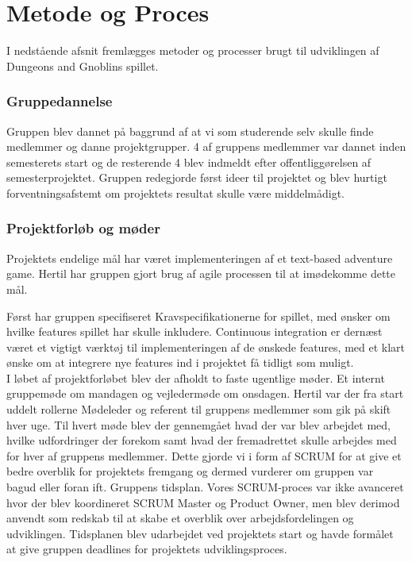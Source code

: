 \newpage

\section{Metode og Proces}
I nedstående afsnit fremlægges metoder og processer brugt til udviklingen af
Dungeons and Gnoblins spillet.

\subsubsection{Gruppedannelse}
Gruppen blev dannet på baggrund af at vi som studerende selv skulle finde medlemmer og danne projektgrupper. 4 af gruppens medlemmer var dannet inden semesterets start og de resterende 4 blev indmeldt efter offentliggørelsen af semesterprojektet. Gruppen redegjorde først ideer til projektet og blev hurtigt forventningsafstemt om projektets resultat skulle være middelmådigt. 

\subsubsection{Projektforløb og møder}
Projektets endelige mål har været implementeringen af et text-based adventure game.
Hertil har gruppen gjort brug af agile processen til at imødekomme dette mål.

Først har gruppen specifiseret Kravspecifikationerne for spillet, med ønsker om
hvilke features spillet har skulle inkludere. Continuous integration er dernæst
været et vigtigt værktøj til implementeringen af de ønskede features, med et klart
ønske om at integrere nye features ind i projektet få tidligt som muligt.\\

I løbet af projektforløbet blev der afholdt to faste ugentlige møder. Et internt gruppemøde om mandagen og vejledermøde om onsdagen. Hertil var der fra start uddelt rollerne Mødeleder og referent til gruppens medlemmer som gik på skift hver uge. Til hvert møde blev der gennemgået hvad der var blev arbejdet med, hvilke udfordringer der forekom samt hvad der fremadrettet skulle arbejdes med for hver af gruppens medlemmer. Dette gjorde vi i form af SCRUM for at give et bedre overblik for projektets fremgang og dermed vurderer om gruppen var bagud eller foran ift. Gruppens tidsplan. Vores SCRUM-proces var ikke avanceret hvor der blev koordineret SCRUM Master og Product Owner, men blev derimod anvendt som redskab til at skabe et overblik over arbejdsfordelingen og udviklingen. Tidsplanen blev udarbejdet ved projektets start og havde formålet at give gruppen deadlines for projektets udviklingsproces.

